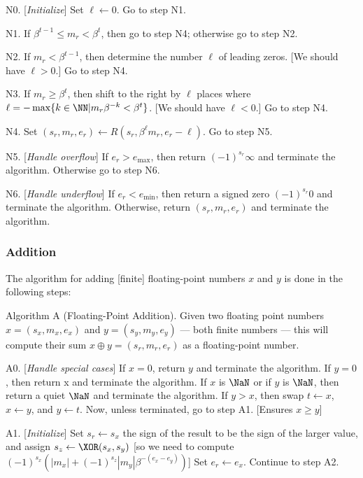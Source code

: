 \algstep N0. [{\it Initialize\/}] Set $\ell\gets0$. Go to step N1.

\algstep N1. If $\beta^{t-1}\leq m_{r}<\beta^{t}$, then go to step N4;
otherwise go to step N2.

\algstep N2. If $m_{r} < \beta^{t-1}$, then determine the number $\ell$
of leading zeros. [We should have $\ell>0$.] Go to step N4.

\algstep N3. If $m_{r} \geq \beta^{t}$, then shift to the right by
$\ell$ places where $\ell = -\max\{k\in\NN | m_{r}\beta^{-k}<\beta^{t}\}$.
[We should have $\ell < 0$.]
Go to step N4.

\algstep N4. Set $(s_{r},m_{r},e_{r})\gets R(s_{r},\beta^{\ell}m_{r},e_{r}-\ell)$.
Go to step N5.

\algstep N5. [{\it Handle overflow\/}] If $e_{r}>e_{\text{max}}$, then
return $(-1)^{s_{r}}\infty$ and terminate the algorithm. Otherwise go to
step N6.

\algstep N6. [{\it Handle underflow\/}] If $e_{r}<e_{\text{min}}$, then
return a signed zero $(-1)^{s_{r}}0$ and terminate the
algorithm. Otherwise, return $(s_{r},m_{r},e_{r})$ and terminate the algorithm.\quad\slug
{}

\subsubsection{Addition}

The algorithm for adding [finite] floating-point numbers $x$ and $y$ is
done in the following steps:

\algbegin Algorithm A (Floating-Point Addition). \label{alg:float-addition}Given two floating
point numbers $x=(s_{x},m_{x},e_{x})$ and $y=(s_{y},m_{y},e_{y})$ ---
both finite numbers --- this
will compute their sum $x\oplus y = (s_{r}, m_{r}, e_{r})$ as a
floating-point number.

\algstep A0. [{\it Handle special cases\/}]
If $x = 0$, return $y$ and terminate the algorithm.
If $y=0$, then return x and terminate the algorithm.
If $x$ is $\NaN$ or if $y$ is $\NaN$, then return a quiet $\NaN$
and terminate the algorithm.
If $y > x$, then swap $t\gets x$, $x\gets y$, and $y\gets t$.
Now, unless terminated, go to step A1. [Ensures $x\geq y$]

\algstep A1. [{\it Initialize\/}]
Set $s_{r}\gets s_{x}$ the sign of the
result to be the sign of the larger value, and assign $s_{z} \gets \XOR(s_{x},s_{y})$
[so we need to compute $(-1)^{s_{x}}(|m_{x}| + (-1)^{s_{z}}|m_{y}|\beta^{-(e_{x}-e_{y})})$]
Set $e_{r}\gets e_{x}$. Continue to step A2.

